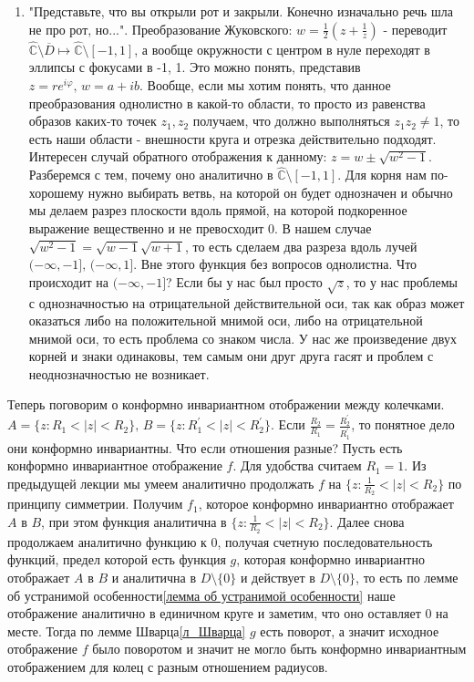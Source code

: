 \documentclass[12pt,a4paper]{article} %
\newcommand{\Co}{\mathbb{C}}
\begin{document}
\begin{enumerate}
		\item "Представьте, что вы открыли рот и закрыли. Конечно изначально речь шла не про рот, но...". Преобразование Жуковского: $w=\frac{1}{2}(z+\frac{1}{z})$ - переводит $\widehat{\Co}\setminus\overline{D}\mapsto\widehat{\Co}\setminus[-1,1]$, а вообще окружности с центром в нуле переходят в эллипсы с фокусами в -1, 1. Это можно понять, представив $z=re^{i\varphi},\,w=a+ib$. Вообще, если мы хотим понять, что данное преобразования однолистно в какой-то области, то просто из равенства образов каких-то точек $z_1,z_2$ получаем, что должно выполняться $z_1z_2\neq1$, то есть наши области - внешности круга и отрезка действительно подходят. Интересен случай обратного отображения к данному: $z=w\pm\sqrt{w^2-1}$. Разберемся с тем, почему оно аналитично в $\widehat{\Co}\setminus[-1,1]$. Для корня нам по-хорошему нужно выбирать ветвь, на которой он будет однозначен и обычно мы делаем разрез плоскости вдоль прямой, на которой подкоренное выражение вещественно и не превосходит 0. В нашем случае $\sqrt{w^2-1}=\sqrt{w-1}\sqrt{w+1}$, то есть сделаем два разреза вдоль лучей $(-\infty,-1],\,(-\infty,1]$. Вне этого функция без вопросов однолистна. Что происходит на $(-\infty,-1]$? Если бы у нас был просто $\sqrt{z}$, то у нас проблемы с однозначностью на отрицательной действительной оси, так как образ может оказаться либо на положительной мнимой оси, либо на отрицательной мнимой оси, то есть проблема со знаком числа. У нас же произведение двух корней и знаки одинаковы, тем самым они друг друга гасят и проблем с неоднозначностью не возникает.
	\end{enumerate}\par
	Теперь поговорим о конформно инвариантном отображении между колечками. \\$A=\{z:R_1<|z|<R_2\},\,B=\{z:R_1^{'}<|z|<R_2^{'}\}$. Если $\frac{R_2}{R_1}=\frac{R_2^{'}}{R_1^{'}}$, то понятное дело они конформно инвариантны. Что если отношения разные? Пусть есть конформно инвариантное отображение $f$. Для удобства считаем $R_1=1$. Из предыдущей лекции мы умеем аналитично продолжать $f$ на $\{z:\frac{1}{R_2}<|z|<R_2\}$ по принципу симметрии. Получим $f_1$, которое конформно инвариантно отображает $A$ в $B$, при этом функция аналитична в $\{z:\frac{1}{R_2}<|z|<R_2\}$. Далее снова продолжаем аналитично функцию к 0, получая счетную последовательность функций, предел которой есть функция $g$, которая конформно инвариантно отображает $A$ в $B$ и аналитична в $D\setminus\{0\}$ и действует в $D\setminus\{0\}$, то есть по лемме об устранимой особенности\eqref{лемма об устранимой особенности} наше отображение аналитично в единичном круге и заметим, что оно оставляет 0 на месте. Тогда по лемме Шварца\eqref{л_Шварца} $g$ есть поворот, а значит исходное отображение $f$ было поворотом и значит не могло быть конформно инвариантным отображением для колец с разным отношением радиусов.
\end{document}
